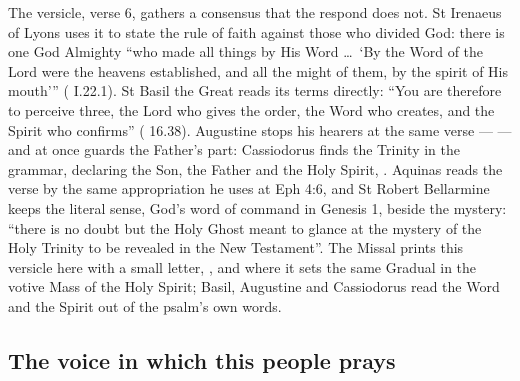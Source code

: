 The versicle, verse 6, gathers a consensus that the respond does not. St
Irenaeus of Lyons uses it to state the rule of faith against those who divided
God: there is one God Almighty ``who made all things by His Word \dots\ `By
the Word of the Lord were the heavens established, and all the might of them, by
the spirit of His mouth''' ( I.22.1). St Basil the
Great reads its terms directly: ``You are therefore to perceive three, the Lord
who gives the order, the Word who creates, and the Spirit who confirms''
( 16.38). Augustine stops his hearers at the same
verse ---  --- and at once guards the Father's part:  Cassiodorus finds the Trinity in the grammar,  declaring
the Son,  the Father and  the Holy
Spirit, . Aquinas reads the verse by the same appropriation he uses at
Eph 4:6, and St Robert Bellarmine keeps the literal sense, God's word of
command in Genesis 1, beside the mystery: ``there is no doubt but the Holy
Ghost meant to glance at the mystery of the Holy Trinity to be revealed in the
New Testament''. The Missal prints this versicle here with a small
letter, , and  where it sets the same Gradual in
the votive Mass of the Holy Spirit; Basil, Augustine and Cassiodorus read the
Word and the Spirit out of the psalm's own words.

\subsection{The voice in which this people prays}


